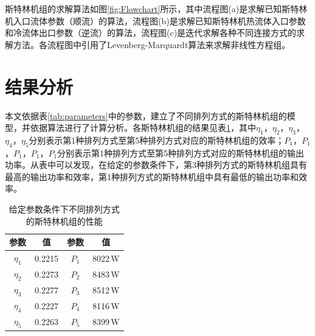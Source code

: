 斯特林机组的求解算法如图\ref{fig:Flowchart}所示，其中流程图(a)是求解已知斯特林机入口流体参数（顺流）的算法，流程图(b)是求解已知斯特林机热流体入口参数和冷流体出口参数（逆流）的算法，流程图(c)是迭代求解各种不同连接方式的求解方法。各流程图中引用了Levenberg-Marquardt算法来求解非线性方程组。

\section{结果分析}

本文依据表\ref{tab:parameters}中的参数，建立了不同排列方式的斯特林机组的模型，并依据算法进行了计算分析。各斯特林机组的结果见表\ref{tab:result}，其中$\eta_1$，$\eta_2$，$\eta_3$，$\eta_4$，$\eta_5$分别表示第1种排列方式至第5种排列方式对应的斯特林机组的效率；$P_1$，$P_1$，$P_1$，$P_1$，$P_1$分别表示第1种排列方式至第5种排列方式对应的斯特林机组的输出功率。从表中可以发现，在给定的参数条件下，第3种排列方式的斯特林机组具有最高的输出功率和效率，第1种排列方式的斯特林机组中具有最低的输出功率和效率。

\begin{table}[htbp]
\setlength{\abovecaptionskip}{-10pt}
	\caption{给定参数条件下不同排列方式的斯特林机组的性能}
	\begin{center}
	\begin{tabular}{cccc}
		\toprule
		参数		&	值	&	参数		&	值\\
		\midrule
		$\eta_1$	&	0.2215	&	$P_1$		&	8022\,W\\
		$\eta_2$	&	0.2273	&	$P_2$		&	8483\,W\\
		$\eta_3$	&	0.2277	&	$P_3$		&	8512\,W\\
		$\eta_4$	&	0.2227	&	$P_4$		&	8116\,W\\
		$\eta_5$	&	0.2263	&	$P_5$		&	8399\,W\\		
		\bottomrule
	\end{tabular}
	\end{center}
	\label{tab:result}
\end{table}

